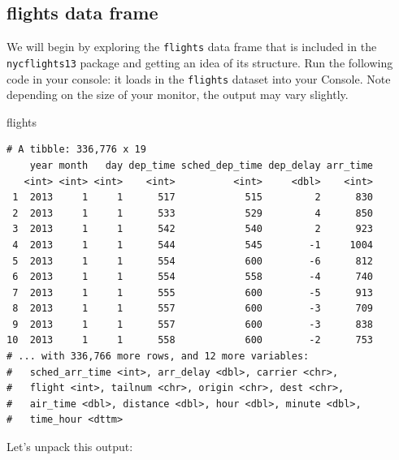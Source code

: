 \documentclass[12pt,]{krantz}
\makeatletter
\newenvironment{Shaded}{\begin{snugshade}}{\end{snugshade}}
\newcommand{\NormalTok}[1]{#1}
\newenvironment{kframe}{%
\medskip{}
\setlength{\fboxsep}{.8em}
 \def\at@end@of@kframe{}%
 \ifinner\ifhmode%
  \def\at@end@of@kframe{\end{minipage}}%
  \begin{minipage}{\columnwidth}%
 \fi\fi%
 \def\FrameCommand##1{\hskip\@totalleftmargin \hskip-\fboxsep
 \colorbox{shadecolor}{##1}\hskip-\fboxsep
     \hskip-\linewidth \hskip-\@totalleftmargin \hskip\columnwidth}%
 \MakeFramed {\advance\hsize-\width
   \@totalleftmargin\z@ \linewidth\hsize
   \@setminipage}}%
 {\par\unskip\endMakeFramed%
 \at@end@of@kframe}
\renewenvironment{Shaded}{\begin{kframe}}{\end{kframe}}
\theoremstyle{definition}
\theoremstyle{definition}
\theoremstyle{definition}
\theoremstyle{remark}
\makeatother
\begin{document}
\subsection{flights data frame}\label{flights-data-frame}

We will begin by exploring the \texttt{flights} data frame that is
included in the \texttt{nycflights13} package and getting an idea of its
structure. Run the following code in your console: it loads in the
\texttt{flights} dataset into your Console. Note depending on the size
of your monitor, the output may vary slightly.

\begin{Shaded}
\begin{Highlighting}[]
\NormalTok{flights}
\end{Highlighting}
\end{Shaded}

\begin{verbatim}
# A tibble: 336,776 x 19
    year month   day dep_time sched_dep_time dep_delay arr_time
   <int> <int> <int>    <int>          <int>     <dbl>    <int>
 1  2013     1     1      517            515         2      830
 2  2013     1     1      533            529         4      850
 3  2013     1     1      542            540         2      923
 4  2013     1     1      544            545        -1     1004
 5  2013     1     1      554            600        -6      812
 6  2013     1     1      554            558        -4      740
 7  2013     1     1      555            600        -5      913
 8  2013     1     1      557            600        -3      709
 9  2013     1     1      557            600        -3      838
10  2013     1     1      558            600        -2      753
# ... with 336,766 more rows, and 12 more variables:
#   sched_arr_time <int>, arr_delay <dbl>, carrier <chr>,
#   flight <int>, tailnum <chr>, origin <chr>, dest <chr>,
#   air_time <dbl>, distance <dbl>, hour <dbl>, minute <dbl>,
#   time_hour <dttm>
\end{verbatim}

Let's unpack this output:
\end{document}
